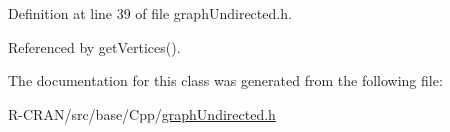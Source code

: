 Definition at line 39 of file graph\+Undirected.\+h.



Referenced by get\+Vertices().



The documentation for this class was generated from the following file\+:\begin{DoxyCompactItemize}
\item 
R-\/\+C\+R\+A\+N/src/base/\+Cpp/\hyperlink{graphUndirected_8h}{graph\+Undirected.\+h}\end{DoxyCompactItemize}
